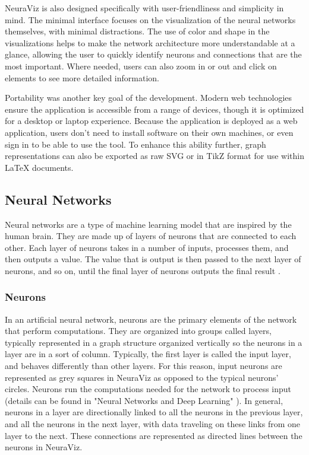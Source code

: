 NeuraViz is also designed specifically with user-friendliness and simplicity in mind. The minimal interface focuses on the visualization of the neural networks themselves, with minimal distractions. The use of color and shape in the visualizations helps to make the network architecture more understandable at a glance, allowing the user to quickly identify neurons and connections that are the most important. Where needed, users can also zoom in or out and click on elements to see more detailed information.

Portability was another key goal of the development. Modern web technologies ensure the application is accessible from a range of devices, though it is optimized for a desktop or laptop experience. Because the application is deployed as a web application, users don't need to install software on their own machines, or even sign in to be able to use the tool. To enhance this ability further, graph representations can also be exported as raw SVG or in TikZ \cite{tikz} format for use within \LaTeX{} documents. 

\subsection{Neural Networks} \label{sec:neural_networks}
Neural networks are a type of machine learning model that are inspired by the human brain. They are made up of layers of neurons that are connected to each other. Each layer of neurons takes in a number of inputs, processes them, and then outputs a value. The value that is output is then passed to the next layer of neurons, and so on, until the final layer of neurons outputs the final result \cite{neuralnetworksanddeeplearning}.

\subsubsection{Neurons}
In an artificial neural network, neurons are the primary elements of the network that perform computations. They are organized into groups called layers, typically represented in a graph structure organized vertically so the neurons in a layer are in a sort of column. Typically, the first layer is called the input layer, and behaves differently than other layers. For this reason, input neurons are represented as grey squares in NeuraViz as opposed to the typical neurons' circles. Neurons run the computations needed for the network to process input (details can be found in "Neural Networks and Deep Learning" \cite{neuralnetworksanddeeplearning}). In general, neurons in a layer are directionally linked to all the neurons in the previous layer, and all the neurons in the next layer, with data traveling on these links from one layer to the next. These connections are represented as directed lines between the neurons in NeuraViz.

